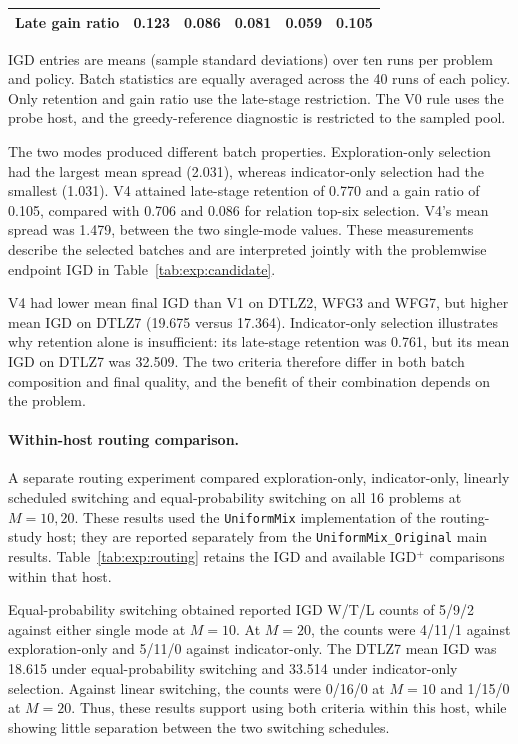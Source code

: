 \begin{table}[t]
\begin{tabular}{lccccc}
Late gain ratio & 0.123 & 0.086 & 0.081 & 0.059 & 0.105 \\
\bottomrule
\end{tabular}
\par\smallskip
\begin{minipage}{\linewidth}
\scriptsize IGD entries are means (sample standard deviations) over ten runs per problem and policy. Batch statistics are equally averaged across the 40 runs of each policy. Only retention and gain ratio use the late-stage restriction. The V0 rule uses the probe host, and the greedy-reference diagnostic is restricted to the sampled pool.
\end{minipage}
\end{table}

The two modes produced different batch properties. Exploration-only
selection had the largest mean spread (2.031), whereas indicator-only
selection had the smallest (1.031). V4 attained late-stage retention
of 0.770 and a gain ratio of 0.105, compared with 0.706 and 0.086 for
relation top-six selection. V4's mean spread was 1.479, between the two
single-mode values. These measurements describe the selected batches
and are interpreted jointly with the problemwise endpoint IGD in
Table~\ref{tab:exp:candidate}.

V4 had lower mean final IGD than V1 on DTLZ2, WFG3 and WFG7, but higher
mean IGD on DTLZ7 (19.675 versus 17.364). Indicator-only selection
illustrates why retention alone is insufficient: its late-stage
retention was 0.761, but its mean IGD on DTLZ7 was 32.509. The two
criteria therefore differ in both batch composition and final quality,
and the benefit of their combination depends on the problem.

\paragraph{Within-host routing comparison.}
A separate routing experiment compared exploration-only,
indicator-only, linearly scheduled switching and equal-probability
switching on all 16 problems at $M=10,20$. These results used the
\texttt{UniformMix} implementation of the routing-study host; they are
reported separately from the \texttt{UniformMix\_Original} main results.
Table~\ref{tab:exp:routing} retains the IGD and available IGD$^+$
comparisons within that host.

Equal-probability switching obtained reported IGD W/T/L counts of
5/9/2 against either single mode at $M=10$. At $M=20$, the counts were
4/11/1 against exploration-only and 5/11/0 against indicator-only.
The DTLZ7 mean IGD was 18.615 under equal-probability switching and
33.514 under indicator-only selection. Against linear switching, the
counts were 0/16/0 at $M=10$ and 1/15/0 at $M=20$. Thus, these results
support using both criteria within this host, while showing little
separation between the two switching schedules.


